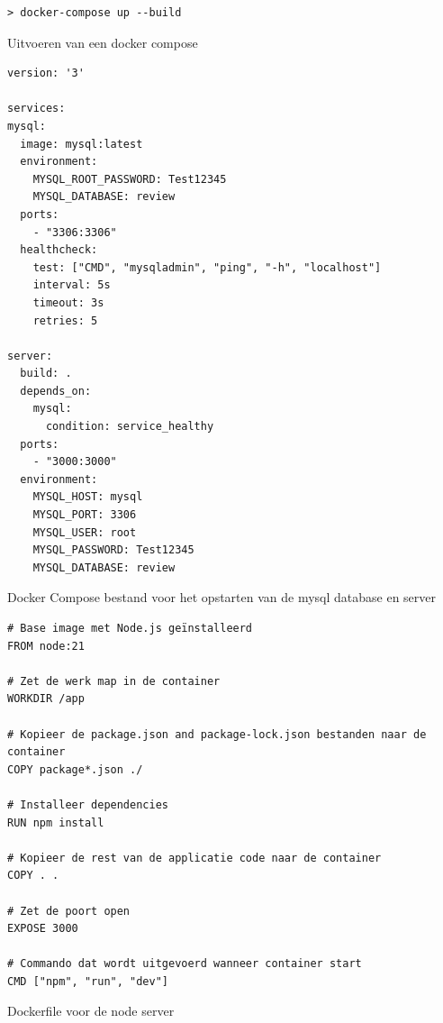 \begin{listing}[H]
  \centering
  \begin{verbatim}
> docker-compose up --build
      \end{verbatim}
      \caption{\label{code:dockercompose}Uitvoeren van een docker compose}
\end{listing}
\begin{listing}[H]
  \centering
  \begin{verbatim}
version: '3'

services:
mysql:
  image: mysql:latest
  environment:
    MYSQL_ROOT_PASSWORD: Test12345
    MYSQL_DATABASE: review
  ports:
    - "3306:3306"
  healthcheck:
    test: ["CMD", "mysqladmin", "ping", "-h", "localhost"]
    interval: 5s
    timeout: 3s
    retries: 5

server:
  build: .
  depends_on:
    mysql:
      condition: service_healthy
  ports:
    - "3000:3000"
  environment:
    MYSQL_HOST: mysql
    MYSQL_PORT: 3306
    MYSQL_USER: root
    MYSQL_PASSWORD: Test12345
    MYSQL_DATABASE: review
      \end{verbatim}
      \caption{\label{code:dockercompose}Docker Compose bestand voor het opstarten van de mysql database en server}
\end{listing}

\begin{listing}[H]
  \centering
  \begin{verbatim}
# Base image met Node.js geïnstalleerd
FROM node:21

# Zet de werk map in de container
WORKDIR /app

# Kopieer de package.json and package-lock.json bestanden naar de container
COPY package*.json ./

# Installeer dependencies
RUN npm install

# Kopieer de rest van de applicatie code naar de container
COPY . .

# Zet de poort open
EXPOSE 3000

# Commando dat wordt uitgevoerd wanneer container start
CMD ["npm", "run", "dev"]
      \end{verbatim}
      \caption{\label{code:dockernode}Dockerfile voor de node server}
\end{listing}


